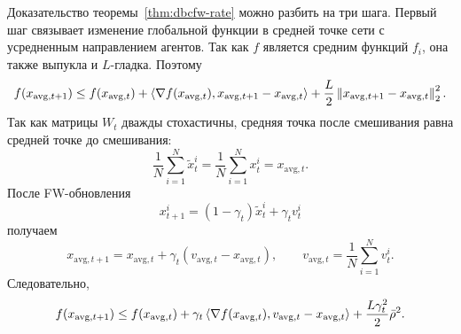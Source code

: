 Доказательство теоремы~\ref{thm:dbcfw-rate} можно разбить на три шага.
Первый шаг связывает изменение глобальной функции в средней точке сети с усредненным
направлением агентов.
Так как $f$ является средним функций $f_i$, она также выпукла и $L$-гладка.
Поэтому
\[
    f(x_{\mathrm{avg},t+1})
    \leq
    f(x_{\mathrm{avg},t})
    +
    \left\langle \nabla f(x_{\mathrm{avg},t}), x_{\mathrm{avg},t+1}-x_{\mathrm{avg},t} \right\rangle
    +
    \frac{L}{2}
    \left\|x_{\mathrm{avg},t+1}-x_{\mathrm{avg},t}\right\|_2^2.
\]
Так как матрицы $W_t$ дважды стохастичны, средняя точка после смешивания равна средней
точке до смешивания:
\[
    \frac{1}{N}\sum_{i=1}^{N}\tilde x_t^i
    =
    \frac{1}{N}\sum_{i=1}^{N}x_t^i
    =
    x_{\mathrm{avg},t}.
\]
После FW-обновления
\[
    x_{t+1}^i=(1-\gamma_t)\tilde x_t^i+\gamma_t v_t^i
\]
получаем
\[
    x_{\mathrm{avg},t+1}
    =
    x_{\mathrm{avg},t}
    +
    \gamma_t
    (v_{\mathrm{avg},t}-x_{\mathrm{avg},t}),
    \qquad
    v_{\mathrm{avg},t}=\frac{1}{N}\sum_{i=1}^{N}v_t^i.
\]
Следовательно,
\[
    f(x_{\mathrm{avg},t+1})
    \leq
    f(x_{\mathrm{avg},t})
    +
    \gamma_t
    \left\langle \nabla f(x_{\mathrm{avg},t}), v_{\mathrm{avg},t}-x_{\mathrm{avg},t} \right\rangle
    +
    \frac{L\gamma_t^2}{2}\bar\rho^2.
\]

